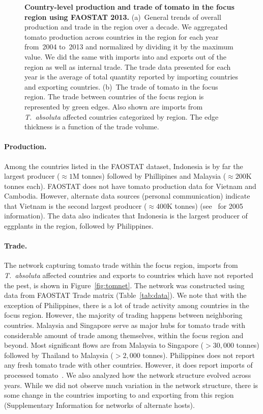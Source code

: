\documentclass[11pt]{article}
\newcommand{\tuta}{\emph{T.~absoluta}}
\theoremstyle{definition}
\begin{document}
\begin{figure}[ht]
\begin{subfigure}[b]{.45\textwidth}
\end{subfigure}
\caption{\textbf{Country-level production and trade of tomato in the focus
region using FAOSTAT 2013.} (a)~General trends of overall production and
trade in the region over a decade. We aggregated tomato production across
countries in the region for each year from~2004 to~2013 and normalized by
dividing it by the maximum value. We did the same with imports into and
exports out of the region as well as internal trade. The trade data
presented for each year is the average of total quantity reported by
importing countries and exporting countries. (b)~The trade of tomato in the
focus region. The trade between countries of the focus region is
represented by green edges.  Also shown are imports from \tuta{} affected
countries categorized by region. The edge thickness is a function of the
trade volume.}
\end{figure}

\paragraph{Production.}
Among the countries listed in the FAOSTAT dataset, Indonesia is by far the
largest producer ($\approx1$M tonnes) followed by Phillipines and Malaysia
($\approx200$K tonnes each).  FAOSTAT does not have tomato production data
for Vietnam and Cambodia.  However, alternate data sources (personal
communication) indicate that Vietnam is the second largest producer
($\approx400$K tonnes) (see~\cite{vien2006overview} for 2005 information).
The data also indicates that Indonesia is the largest producer of eggplants
in the region, followed by Philippines.

\paragraph{Trade.}
The network capturing tomato trade within the focus region, imports from
\tuta{} affected countries and exports to countries which have not reported the
pest, is shown in Figure~\ref{fig:tomnet}. The network was constructed
using data from FAOSTAT Trade matrix (Table~\ref{tab:data}). We note that
with the exception of Philippines, there is a lot of trade activity among
countries in the focus region. However, the majority of trading happens
between neighboring countries. Malaysia and Singapore serve as major hubs
for tomato trade with considerable amount of trade among themselves, within
the focus region and beyond. Most significant flows are from Malaysia to
Singapore ($>30,000$ tonnes) followed by Thailand to Malaysia ($>2,000$
tonnes).  Philippines does not report any fresh tomato trade with other
countries.  However, it does report imports of processed tomato~\cite{}. We
also analyzed how the network structure evolved across years. While we did
not observe much variation in the network structure, there is some change
in the countries importing to and exporting from this region (Supplementary Information for networks of alternate hosts).
\end{document}
